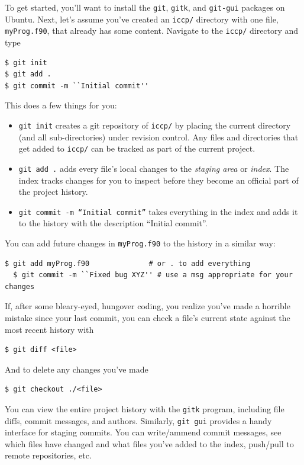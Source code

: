 \documentclass[openany,oneside]{report}
\begin{document}
To get started, you'll want to install the \texttt{git}, \texttt{gitk}, and \texttt{git-gui} packages on Ubuntu. Next, let's assume you've created an \texttt{iccp/} directory with one file, \texttt{myProg.f90}, that already has some content. Navigate to the \texttt{iccp/} directory and type
\begin{verbatim}
$ git init
$ git add .
$ git commit -m ``Initial commit''
\end{verbatim}
This does a few things for you:
\begin{itemize}
  \item \texttt{git init} creates a git repository of \texttt{iccp/} by placing the current directory (and all sub-directories) under revision control.
    Any files and directories that get added to \texttt{iccp/} can be tracked as part of the current project.
  \item \texttt{git add .} adds every file's local changes to the \emph{staging area} or \emph{index}.
    The index tracks changes for you to inspect before they become an official part of the project history.
  \item \texttt{git commit -m ``Initial commit''} takes everything in the index and adds it to the history with the description ``Initial commit''.
\end{itemize}
You can add future changes in \texttt{myProg.f90} to the history in a similar way:
\begin{lstlisting}[style=Bash,nolol]
  $ git add myProg.f90              # or . to add everything
  $ git commit -m ``Fixed bug XYZ'' # use a msg appropriate for your changes
\end{lstlisting}
If, after some bleary-eyed, hungover coding, you realize you've made a horrible mistake since your last commit, you can check a file's current state against the most recent history with
\begin{verbatim}
$ git diff <file>
\end{verbatim}
And to delete any changes you've made
\begin{verbatim}
$ git checkout ./<file>
\end{verbatim}
You can view the entire project history with the \texttt{gitk} program, including file diffs, commit messages, and authors. Similarly, \texttt{git gui} provides a handy interface for staging commits. You can write/ammend commit messages, see which files have changed and what files you've added to the index, push/pull to remote repositories, etc.
\end{document}
